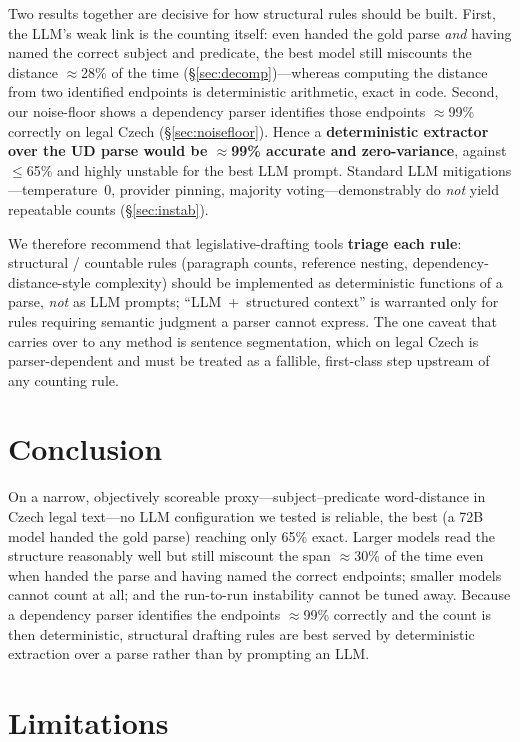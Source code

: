\documentclass[11pt]{article}
\begin{document}
Two results together are decisive for how structural rules should be built. First, the LLM's weak
link is the counting itself: even handed the gold parse \emph{and} having named the correct subject
and predicate, the best model still miscounts the distance $\approx$28\% of the time
(\S\ref{sec:decomp})---whereas computing the distance from two identified endpoints is deterministic
arithmetic, exact in code. Second, our noise-floor shows a dependency parser identifies those
endpoints $\approx$99\% correctly on legal Czech (\S\ref{sec:noisefloor}). Hence a \textbf{deterministic
extractor over the UD parse would be $\approx$99\% accurate and zero-variance}, against $\leq$65\%
and highly unstable for the best LLM prompt. Standard LLM mitigations---temperature~0, provider
pinning, majority voting---demonstrably do \emph{not} yield repeatable counts (\S\ref{sec:instab}).

We therefore recommend that legislative-drafting tools \textbf{triage each rule}: structural /
countable rules (paragraph counts, reference nesting, dependency-distance-style complexity) should be
implemented as deterministic functions of a parse, \emph{not} as LLM prompts; ``LLM~+~structured
context'' is warranted only for rules requiring semantic judgment a parser cannot express. The one
caveat that carries over to any method is sentence segmentation, which on legal Czech is
parser-dependent and must be treated as a fallible, first-class step upstream of any counting rule.

\section{Conclusion}

On a narrow, objectively scoreable proxy---subject--predicate word-distance in Czech legal text---no
LLM configuration we tested is reliable, the best (a 72B model handed the gold parse) reaching only
65\% exact. Larger models read the structure reasonably well but still miscount the span
$\approx$30\% of the time even when handed the parse and having named the correct endpoints; smaller
models cannot count at all; and the run-to-run instability cannot be tuned away. Because a
dependency parser identifies the endpoints $\approx$99\% correctly and the count is then
deterministic, structural drafting rules are best served by deterministic extraction over a parse
rather than by prompting an LLM.

\section*{Limitations}
\end{document}
